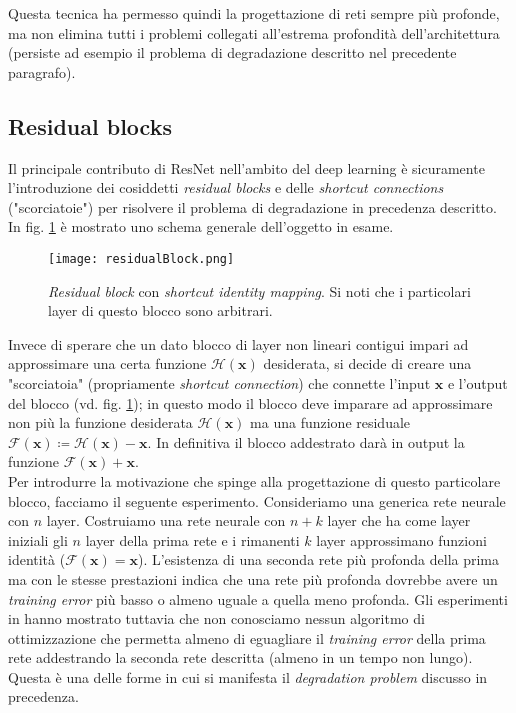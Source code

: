 Questa tecnica ha permesso quindi la progettazione di reti sempre più profonde, ma non elimina tutti i problemi collegati all'estrema profondità dell'architettura (persiste ad esempio il problema di degradazione descritto nel precedente paragrafo).

\subsection{Residual blocks}
\label{residualBlock}
Il principale contributo di ResNet nell'ambito del deep learning è sicuramente l'introduzione dei cosiddetti \textit{residual blocks} e delle \textit{shortcut connections} ("scorciatoie") per risolvere il problema di degradazione in precedenza descritto. In fig. \ref{fig:residualBlock} è mostrato uno schema generale dell'oggetto in esame.

\begin{figure}[h!]
\centering
\texttt{[image: residualBlock.png]}
\caption{\textit{Residual block} con \textit{shortcut identity mapping}. Si noti che i particolari layer di questo blocco sono arbitrari.}
\label{fig:residualBlock}
\end{figure}

Invece di sperare che un dato blocco di layer non lineari contigui impari ad approssimare una certa funzione $\mathcal{H}(\mathbf{x})$ desiderata, si decide di creare una "scorciatoia" (propriamente \textit{shortcut connection}) che connette l'input $\mathbf{x}$ e l'output del blocco (vd. fig. \ref{fig:residualBlock}); in questo modo il blocco deve imparare ad approssimare non più la funzione desiderata $\mathcal{H}(\mathbf{x})$ ma una funzione residuale $\mathcal{F}(\mathbf{x})\coloneqq\mathcal{H}(\mathbf{x})-\mathbf{x}$. In definitiva il blocco addestrato darà in output la funzione $\mathcal{F}(\mathbf{x})+\mathbf{x}$.\\

Per introdurre la motivazione che spinge alla progettazione di questo particolare blocco, facciamo il seguente esperimento.
Consideriamo una generica rete neurale con $n$ layer. Costruiamo una rete neurale con $n+k$ layer che ha come layer iniziali gli $n$ layer della prima rete e i rimanenti $k$ layer approssimano funzioni identità ($\mathcal{F}(\mathbf{x})=\mathbf{x}$). L'esistenza di una seconda rete più profonda della prima ma con le stesse prestazioni indica che una rete più profonda dovrebbe avere un \textit{training error} più basso o almeno uguale a quella meno profonda. Gli esperimenti in \cite{resnet} hanno mostrato tuttavia che non conosciamo nessun algoritmo di ottimizzazione che permetta almeno di eguagliare il \textit{training error} della prima rete addestrando la seconda rete descritta (almeno in un tempo non lungo). Questa è una delle forme in cui si manifesta il \textit{degradation problem} discusso in precedenza.

